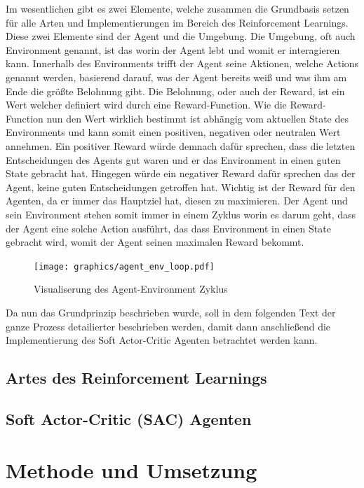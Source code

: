 \documentclass[]{iat}
\begin{document}
Im wesentlichen gibt es zwei Elemente, welche zusammen die Grundbasis setzen für alle Arten und Implementierungen im Bereich des Reinforcement Learnings. Diese zwei Elemente sind der Agent und die Umgebung. Die Umgebung, oft auch Environment genannt, ist das worin der Agent lebt und womit er interagieren kann. Innerhalb des Environments trifft der Agent seine Aktionen, welche Actions genannt werden, basierend darauf, was der Agent bereits weiß und was ihm am Ende die größte Belohnung gibt. Die Belohnung, oder auch der Reward, ist ein Wert welcher definiert wird durch eine Reward-Function. Wie die Reward-Function nun den Wert wirklich bestimmt ist abhängig vom aktuellen State des Environments und kann somit einen positiven, negativen oder neutralen Wert annehmen. Ein positiver Reward würde demnach dafür sprechen, dass die letzten Entscheidungen des Agents gut waren und er das Environment in einen guten State gebracht hat. Hingegen würde ein negativer Reward dafür sprechen das der Agent, keine guten Entscheidungen getroffen hat. Wichtig ist der Reward für den Agenten, da er immer das Hauptziel hat, diesen zu maximieren. Der Agent und sein Environment stehen somit immer in einem Zyklus worin es darum geht, dass der Agent eine solche Action ausführt, das dass Environment in einen State gebracht wird, womit der Agent seinen maximalen Reward bekommt.
\begin{figure}[H]
    \texttt{[image: graphics/agent\_env\_loop.pdf]}
    \centering
    \caption{Visualiserung des Agent-Environment Zyklus}
    \label{abb:agent_env_loop}
\end{figure}
Da nun das Grundprinzip beschrieben wurde, soll in dem folgenden Text der ganze Prozess detailierter beschrieben werden, damit dann anschließend die Implementierung des Soft Actor-Critic Agenten betrachtet werden kann.
\section{Artes des Reinforcement Learnings} \label{sec:arten_rf}
\section{Soft Actor-Critic (SAC) Agenten} \label{sec:howto_sac}

\chapter{Methode und Umsetzung} \label{sec:methode_umsetzung}
\end{document}
